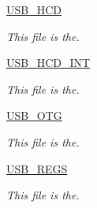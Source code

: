 \begin{DoxyCompactItemize}
\hyperlink{group___u_s_b___h_c_d}{U\-S\-B\-\_\-\-H\-C\-D}
\begin{DoxyCompactList}\small\item\em This file is the. \end{DoxyCompactList}\item 
\hyperlink{group___u_s_b___h_c_d___i_n_t}{U\-S\-B\-\_\-\-H\-C\-D\-\_\-\-I\-N\-T}
\begin{DoxyCompactList}\small\item\em This file is the. \end{DoxyCompactList}\item 
\hyperlink{group___u_s_b___o_t_g}{U\-S\-B\-\_\-\-O\-T\-G}
\begin{DoxyCompactList}\small\item\em This file is the. \end{DoxyCompactList}\item 
\hyperlink{group___u_s_b___r_e_g_s}{U\-S\-B\-\_\-\-R\-E\-G\-S}
\begin{DoxyCompactList}\small\item\em This file is the. \end{DoxyCompactList}\end{DoxyCompactItemize}
